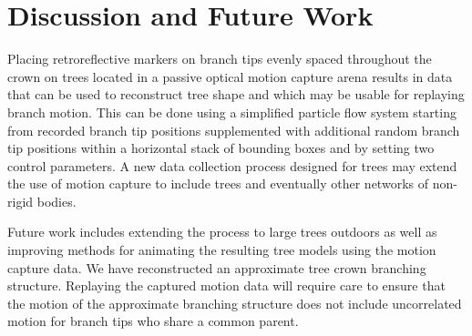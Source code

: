 \section{Discussion and Future Work}

Placing retroreflective markers on branch tips evenly spaced throughout the crown on trees located in a passive optical motion capture arena results in data that can be used to reconstruct tree shape and which may be usable for replaying branch motion.  This can be done using a simplified particle flow system starting from recorded branch tip positions supplemented with additional random branch tip positions within a horizontal stack of bounding boxes and by setting two control parameters.  A new data collection process designed for trees may extend the use of motion capture to include trees and eventually other networks of non-rigid bodies. 

Future work includes extending the process to large trees outdoors as well as improving methods for animating the resulting tree models using the motion capture data.   We have reconstructed an approximate tree crown branching structure.  Replaying the captured motion data will require care to ensure that the motion of the approximate branching structure does not include uncorrelated motion for branch tips who share a common parent.